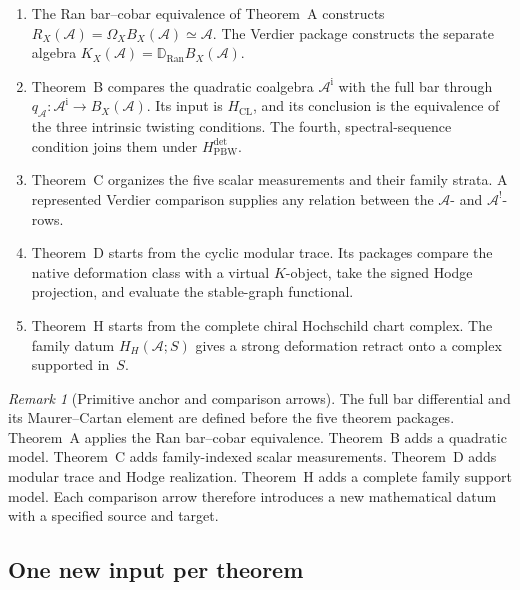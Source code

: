 \documentclass[11pt]{article}
\theoremstyle{plain}
\theoremstyle{definition}
\theoremstyle{remark}
\newtheorem{remark}[theorem]{Remark}
\newcommand{\Ran}{\mathrm{Ran}}
\newcommand{\cA}{\mathcal{A}}
\begin{document}
\begin{enumerate}[label=\textup{(\roman*)}]
\item The Ran bar--cobar equivalence of Theorem~A constructs
\(R_X(\cA)=\Omega_XB_X(\cA)\simeq\cA\).  The Verdier package
constructs the separate algebra \(K_X(\cA)=\mathbb D_{\Ran}B_X(\cA)\).

\item Theorem~B compares the quadratic coalgebra
\(\cA^{\mathrm i}\) with the full bar through
\(q_\cA\colon\cA^{\mathrm i}\to B_X(\cA)\).  Its input is
\(H_{\mathrm{CL}}\), and its conclusion is the equivalence of the
three intrinsic twisting conditions.  The fourth, spectral-sequence
condition joins them under \(H_{\mathrm{PBW}}^{\mathrm{det}}\).

\item Theorem~C organizes the five scalar measurements and their
family strata.  A represented Verdier comparison supplies any
relation between the \(\cA\)- and \(\cA^!\)-rows.

\item Theorem~D starts from the cyclic modular trace.  Its packages
compare the native deformation class with a virtual \(K\)-object,
take the signed Hodge projection, and evaluate the stable-graph
functional.

\item Theorem~H starts from the complete chiral Hochschild chart
complex.  The family datum \(H_H(\cA;S)\) gives a strong deformation
retract onto a complex supported in~\(S\).
\end{enumerate}

\begin{remark}[Primitive anchor and comparison arrows]
\label{rem:non-circular}
The full bar differential and its Maurer--Cartan element are defined
before the five theorem packages.  Theorem~A applies the Ran
bar--cobar equivalence.  Theorem~B adds a quadratic model.
Theorem~C adds family-indexed scalar measurements.  Theorem~D adds
modular trace and Hodge realization.  Theorem~H adds a complete
family support model.  Each comparison arrow therefore introduces a
new mathematical datum with a specified source and target.
\end{remark}

\subsection{One new input per theorem}
\end{document}
